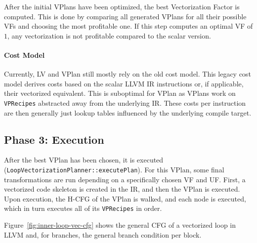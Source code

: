 \documentclass[sigplan,11pt,nonacm]{acmart}
\begin{document}
After the initial VPlans have been optimized, the best Vectorization Factor is computed. This is done 
by comparing all generated VPlans for all their possible VFs and choosing the most profitable one. If 
this step computes an optimal VF of $1$, any vectorization is not profitable compared to the 
scalar version.

\paragraph{Cost Model}
Currently, LV and VPlan still mostly rely on the old cost model. This legacy cost model derives costs 
based on the scalar LLVM IR instructions or, if applicable, their vectorized equivalent.
This is suboptimal for VPlan as VPlans work on \texttt{VPRecipes} abstracted away from the underlying 
IR. These costs per instruction are then generally just lookup tables influenced by the underlying 
compile target.

\subsection{Phase 3: Execution}
After the best VPlan has been chosen, it is executed (\texttt{LoopVectorizationPlanner::executePlan}).
For this VPlan, some final transformations are run depending on a specifically chosen VF and UF.
First, a vectorized code skeleton is created in the IR, and then the VPlan is executed. 
Upon execution, the H-CFG of the VPlan is walked, and each node is executed, which in turn executes all 
of its \texttt{VPRecipes} in order.


Figure~\ref{fig:inner-loop-vec-cfg} shows the general CFG of a vectorized loop in LLVM and, for branches, 
the general branch condition per block.
\end{document}
